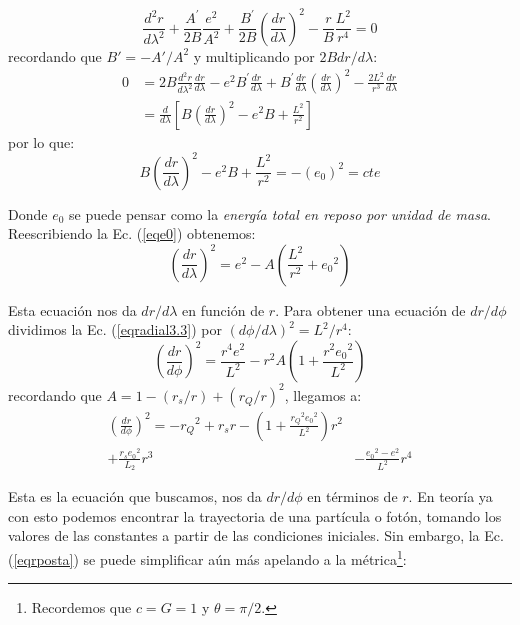 \begin{equation}
    \frac{d^2 r}{d \lambda^2} + \frac{A^\prime}{2B} \frac{e^2}{A^2} + \frac{B^\prime}{2B} \left(\frac{d r}{d \lambda}\right)^2 - \frac{r}{B} \frac{L^2}{r^4} = 0
\end{equation}
recordando que $B\prime=-A\prime/A^2$ y multiplicando por $2Bdr/d\lambda$:
\begin{equation}
\begin{split}
    0&=2B\frac{d^2 r}{d \lambda^2}\frac{dr}{d\lambda} - e^2 B^\prime \frac{dr}{d\lambda} + B^\prime \frac{dr}{d\lambda} \left(\frac{d r}{d \lambda}\right)^2 - \frac{2L^2}{r^3} \frac{dr}{d\lambda}\\
    &=\frac{d}{d\lambda}\left[ B \left(\frac{d r}{d \lambda}\right)^2 - e^2 B + \frac{L^2}{r^2}\right]
\end{split}
\end{equation}
por lo que:
\begin{equation}
    B \left(\frac{d r}{d \lambda}\right)^2 - e^2 B + \frac{L^2}{r^2} = -(e_0)^2 = cte
\label{eqe0}
\end{equation}

Donde $e_0$ se puede pensar como la \textit{energía total en reposo por unidad de masa}. Reescribiendo la Ec. (\ref{eqe0}) obtenemos:
\begin{equation}
    \left(\frac{d r}{d \lambda}\right)^2 = e^2 -A\left( \frac{L^2}{r^2} + {e_0}^2\right)
\label{eqradial3.3}
\end{equation}

Esta ecuación nos da $dr/d\lambda$ en función de $r$. Para obtener una ecuación de $dr/d\phi$ dividimos la Ec. (\ref{eqradial3.3}) por $(d\phi/d\lambda)^2 = L^2/r^4$:
\begin{equation}
    \left( \frac{dr}{d\phi} \right)^2 = \frac{r^4 e^2}{L^2} - r^2 A \left(1 + \frac{r^2 {e_0}^2}{L^2} \right)
\end{equation}
recordando que $A=1 - (r_s/r) + (r_Q/r)^2$, llegamos a:
\begin{equation}
\begin{split}
    \left( \frac{dr}{d\phi} \right)^2 = -{r_Q}^2 + r_s r - \left(1 + \frac{{r_Q}^2 {e_0}^2}{L^2} \right) r^2 &\\+ \frac{r_s {e_0}^2}{L_2} r^3 &- \frac{{e_0}^2 - e^2}{L^2} r^4
\end{split}
\label{eqrposta}
\end{equation}

Esta es la ecuación que buscamos, nos da $dr/d\phi$ en términos de $r$. En teoría ya con esto podemos encontrar la trayectoria de una partícula o fotón, tomando los valores de las constantes a partir de las condiciones iniciales. Sin embargo, la Ec. (\ref{eqrposta}) se puede simplificar aún más apelando a la métrica\footnote{Recordemos que $c=G=1$ y $\theta=\pi/2$.}:

